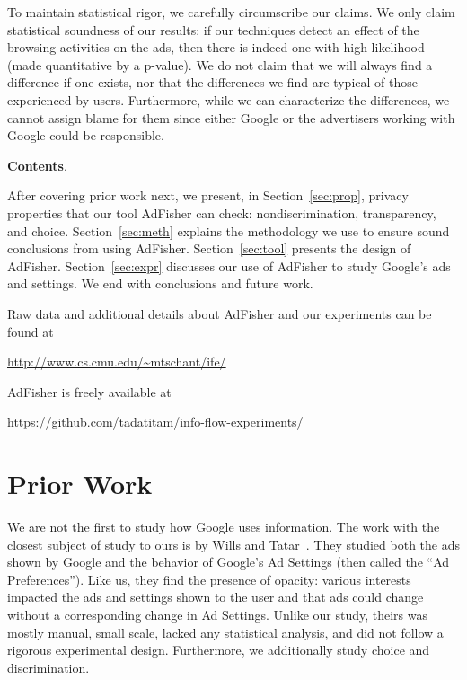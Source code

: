 \documentclass{article}
\makeatletter
\newcommand\gobblepars{\@ifnextchar\par {\expandafter\gobblepars\@gobble}{}}
\renewcommand{\paragraph}[1]{\smallskip\noindent\textbf{#1}.\ \ \gobblepars}
\makeatother
\begin{document}
To maintain statistical rigor, we carefully circumscribe our claims. We only claim statistical soundness of our results: if our techniques detect an effect of the browsing activities on the ads, then there is indeed one with high likelihood (made quantitative by a p-value). We do not claim that we will always find a difference if one exists, nor that the differences we find are typical of those experienced by users. Furthermore, while we can characterize the differences, we cannot assign blame for them since either Google or the advertisers working with Google could be responsible.






\paragraph{Contents}
After covering prior work next, we present, in Section~\ref{sec:prop}, privacy properties that our tool AdFisher can check: nondiscrimination, transparency, and choice.
Section~\ref{sec:meth} explains the methodology we use to ensure sound conclusions from using AdFisher.  Section~\ref{sec:tool} presents the design of AdFisher.  Section~\ref{sec:expr} discusses our use of AdFisher to study Google's ads and settings.
We end with conclusions and future work.

Raw data and additional details about AdFisher and our experiments can be found at\\
\centerline{\url{http://www.cs.cmu.edu/~mtschant/ife/}}
AdFisher is freely available at \\
\centerline{\url{https://github.com/tadatitam/info-flow-experiments/}}


\section{Prior Work}

We are not the first to study how Google uses information.
The work with the closest subject of study to ours is by Wills and Tatar~\cite{wills12wpes}.  They studied both the ads shown by Google and the behavior of Google's Ad Settings (then called the ``Ad Preferences'').  Like us, they find the presence of opacity: various interests impacted the ads and settings shown to the user and that ads could change without a corresponding change in Ad Settings.  
Unlike our study, theirs was mostly manual, small scale, lacked any statistical analysis, and did not follow a rigorous experimental design.  
Furthermore, we additionally study choice and discrimination.
\end{document}
